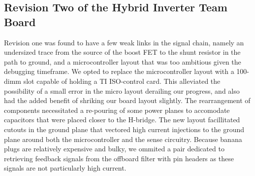 \subsection{Revision Two of the Hybrid Inverter Team Board}
Revision one was found to have a few weak links in the signal chain, namely an undersized trace from the source of the boost FET to the shunt resistor in the path to ground, and a microcontroller layout that was too ambitious given the debugging timeframe. We opted to replace the microcontroller layout with a 100-dimm slot capable of holding a TI ISO-control card. This alleviated the possibility of a small error in the micro layout derailing our progress, and also had the added benefit of shriking our board layout slightly. The rearrangement of components necessitated a re-pouring of some power planes to accomodate capacitors that were placed closer to the H-bridge. The new layout facillitated cutouts in the ground plane that vectored high current injections to the ground plane around both the microcontroller and the sense circuitry. Because banana plugs are relatively expensive and bulky, we ommited a pair dedicated to retrieving feedback signals from the offboard filter with pin headers as these signals are not particularly high current. 
